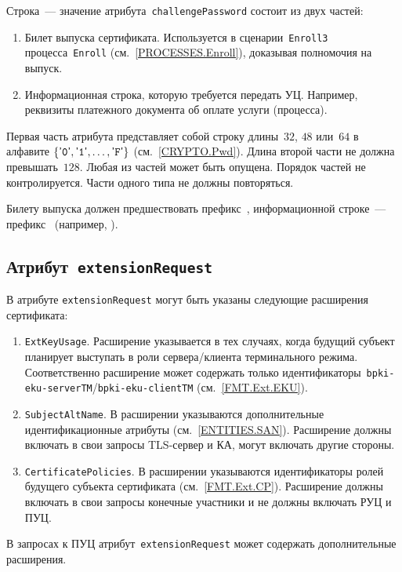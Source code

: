 Строка~--- значение атрибута~\texttt{challengePassword} состоит из двух частей:
\begin{enumerate} 
\item
Билет выпуска сертификата. Используется в сценарии~\texttt{Enroll3} 
процесса~\texttt{Enroll} (см.~\ref{PROCESSES.Enroll}), 
доказывая полномочия на выпуск.

\item
Информационная строка, которую требуется передать УЦ.
Например, реквизиты платежного документа об оплате услуги (процесса).
\end{enumerate}

Первая часть атрибута представляет собой строку длины~$32$, $48$ или~$64$ 
в алфавите  $\{\texttt{\textsf{'}0\textsf{'}},\texttt{\textsf{'}1\textsf{'}},\ldots,\texttt{\textsf{'}F\textsf{'}}\}$ (см.~\ref{CRYPTO.Pwd}).
Длина второй части не должна превышать~$128$. 
Любая из частей может быть опущена. 
Порядок частей не контролируется.
Части одного типа не должны повторяться.

Билету выпуска должен предшествовать префикс~,
информационной строке~--- префикс~
(например, ).

\subsection{Атрибут~\texttt{extensionRequest}}\label{FMT.CSR.ER}

В атрибуте \texttt{extensionRequest} могут быть указаны следующие 
расширения сертификата:
\begin{enumerate}
\item 
\texttt{ExtKeyUsage}. Расширение указывается в тех случаях, 
когда будущий субъект планирует выступать в роли сервера/клиента 
терминального режима.  Соответственно расширение может содержать только 
идентификаторы~\verb|bpki-eku-serverTM|/\verb|bpki-eku-clientTM| 
(см.~\ref{FMT.Ext.EKU}). 

\item 
\texttt{SubjectAltName}. В расширении указываются 
дополнительные идентификационные атрибуты (см.~\ref{ENTITIES.SAN}). 
Расширение должны включать в свои запросы TLS-сервер и КА,
могут включать другие стороны.

\item
\texttt{CertificatePolicies}. В расширении
указываются идентификаторы ролей будущего субъекта сертификата
(см.~\ref{FMT.Ext.CP}).
Расширение должны включать в свои запросы конечные участники 
и не должны включать РУЦ и ПУЦ.
\end{enumerate}

В запросах к ПУЦ атрибут~\texttt{extensionRequest} может содержать 
дополнительные расширения.
